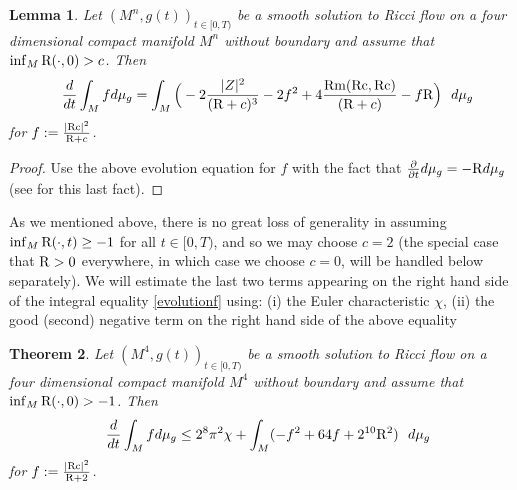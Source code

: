 \documentclass{amsart}
\numberwithin{equation}{section}
\newtheorem{theo}{Theorem}[section]
\newtheorem{lemma}[theo]{Lemma}
\theoremstyle{definition}
\theoremstyle{remark}
\begin{document}
\begin{lemma}
Let $(M^n,g(t))_{t\in [0,T)}$ be a smooth solution to Ricci flow  on a
four dimensional 
compact manifold $M^n$ without boundary and assume that $\inf_M
{{\rm R}}(\cdot,0) >c$.  Then
\begin{eqnarray}
 &&{\frac{d}{d t}} \int_M  f d\mu_g = \int_M \Big(-2\frac{|Z |^2}{({{\rm R}}+c)^3} 
 -2 f^2  +  4\frac {\operatorname{Rm}({{\rm{Rc}}},{{\rm{Rc}}})}{({{\rm R}}+c)}
- f {{\rm R}} \Big) \ \ d\mu_g \label{evolutionf}
\end{eqnarray}
for $ f := \frac{|{{\rm{Rc}}}|^2}{{{\rm R}}+c}$.
\end{lemma}
\begin{proof}
Use the above evolution equation for $f$ with the fact that
${\frac{\partial }{\partial t} } d\mu_g = -{{\rm R}} d\mu_g$ (see \cite{HaThree} for this last fact).
\end{proof}

As we mentioned above, there is no great loss of generality in
assuming $\inf_M {{\rm R}}(\cdot,t) \geq-1$ for all $t \in [0,T) $, and so we may choose $c=2$
(the special case that ${{\rm R}} >0$ everywhere, in which case we choose
$c=0$, will be handled below separately).
We will estimate the last two terms appearing on the right hand side of the
integral equality \eqref{evolutionf} using: (i) the Euler characteristic $\chi$,
(ii) the good (second) negative term on the right hand side of the above equality

\begin{theo}\label{firstestf}
Let $(M^4,g(t))_{t\in [0,T)}$ be a smooth solution to Ricci flow  on a
four dimensional compact manifold $M^4$ without boundary and assume that $\inf_M
{{\rm R}}(\cdot,0) > -1$.  Then
\begin{eqnarray}
 &&{\frac{d}{d t}} \int_M  f d\mu_g  \leq
2^8 \pi^2 \chi + \int_M ( -f^2 +   64 f + 2^{10} {{\rm R}}^2 )  \ \ d\mu_g
\label{generalint}
\end{eqnarray}
for $ f := \frac{|{{\rm{Rc}}}|^2}{{{\rm R}}+2}$.
\end{theo}
\end{document}
